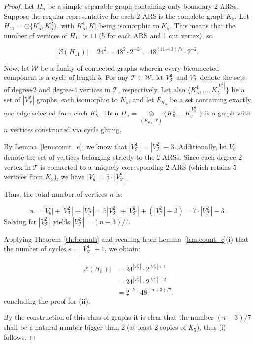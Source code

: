 \documentclass{article}
\begin{document}
        \begin{proof}
            Let $H_n$ be a simple separable graph containing only boundary $2$-ARSs.
            Suppose the regular representative for each $2$-ARS is the complete graph $K_5$.
            Let $H_{11}= \odot\{K^1_5, K^2_5\}$, with $K^1_5, K^2_5$ being isomorphic to $K_5$.
            This means that the number of vertices of $H_{11}$ is $11$ (5 for each ARS and 1 cut vertex), so
        
            $$ |\mathcal{E}(H_{11})| =24^2 = 48^{2}\cdot 2^{-2} = 48^{(11+3)/7} \cdot 2^{-2}. $$
        
            Now, let $\mathcal{W}$ be a family of connected graphs wherein every biconnected component is a cycle of length $3$.
            For any $\mathcal{T} \in \mathcal{W}$, let $V^2_{\mathcal{T}}$ and $V^4_{\mathcal{T}}$ denote the sets of degree-$2$ and degree-$4$ vertices in $\mathcal{T}$, respectively.
            Let also $\{K^1_5, \dots, K^{|V^2_{\mathcal{T}}|}_5 \}$ be a set of $|V^2_{\mathcal{T}}|$ graphs, each isomorphic to $K_5$, and let $E_{K_5}$ be a set containing exactly one edge selected from each $K^i_5$.
            Then $H_n=\underset{(E_{K_5},\mathcal{T})}{\otimes} \{K^1_5, \dots K^{|V^2_{\mathcal{T}}|}_5 \}$ is a graph with $n$ vertices constructed via cycle gluing.
            
            By Lemma~\ref{lem:count_c}, we know that $|V^4_{\mathcal{T}}| = |V^2_{\mathcal{T}}| - 3$.
            Additionally, let $V_b$ denote the set of vertices belonging strictly to the $2$-ARSs.
            Since each degree-$2$ vertex in $\mathcal{T}$ is connected to a uniquely corresponding $2$-ARS (which retains $5$ vertices from $K_5$), we have $|V_b| = 5\cdot |V^2_{\mathcal{T}}|$.
            
            Thus, the total number of vertices $n$ is:
        
            $$ n = |V_b| + |V^2_{\mathcal{T}}| + |V^4_{\mathcal{T}}| = 5|V^2_{\mathcal{T}}| + |V^2_{\mathcal{T}}| + (|V^2_{\mathcal{T}}| - 3) = 7\cdot |V^2_{\mathcal{T}}| - 3. $$
            Solving for $|V^2_{\mathcal{T}}|$ yields $|V^2_{\mathcal{T}}| = (n+3)/7$.
            
            Applying Theorem~\ref{th:formula} and recalling from Lemma~\ref{lem:count_c}(i) that the number of cycles $s = |V^4_{\mathcal{T}}| + 1$, we obtain:
        
            \begin{align*}
            	|\mathcal{E}(H_n)| &= 24^{|V^2_{\mathcal{T}}|} \cdot 2^{|V^4_{\mathcal{T}}|+1}\\
               &= 24^{|V^2_{\mathcal{T}}|} \cdot 2^{|V^2_{\mathcal{T}}|-2} \\
               & = 2^{-2} \cdot 48^{(n+3)/7}.
            \end{align*}
            concluding the proof for (ii).

            By the construction of this class of graphs it is clear that the number $(n+3)/7$ shall be a natural number bigger than $2$ (at least 2 copies of $K_5$), thus (i) follows. 
        \end{proof}
\end{document}
